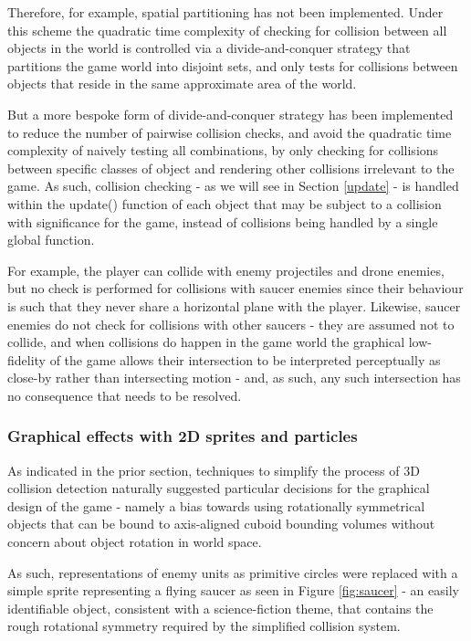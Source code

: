 \documentclass[11pt]{article}
\begin{document}
Therefore, for example, spatial partitioning has not been implemented. Under this scheme the quadratic time
complexity of checking for collision between all objects in the world is controlled via a divide-and-conquer
strategy that partitions the game world into disjoint sets, and only tests for collisions between objects that
reside in the same approximate area of the world.

But a more bespoke form of divide-and-conquer strategy has been implemented to reduce the number of pairwise collision
checks, and avoid the quadratic time complexity of naively testing all combinations, by only checking for collisions
between specific classes of object and rendering other collisions irrelevant to the game. As such, collision checking - 
as we will see in Section \ref{update} - is handled within the update() function of each object that may be subject to
a collision with significance for the game, instead of collisions being handled by a single global function.

For example, the player can collide with enemy projectiles and drone enemies, but no check is performed
for collisions with saucer enemies since their behaviour is such that they never share a horizontal
plane with the player. Likewise, saucer enemies do not check for collisions with other saucers - they are 
assumed not to collide, and when collisions do happen in the game world the graphical low-fidelity of the
game allows their intersection to be interpreted perceptually as close-by rather than intersecting motion -
and, as such, any such intersection has no consequence that needs to be resolved.

\subsubsection*{Graphical effects with 2D sprites and particles}

As indicated in the prior section, techniques to simplify the process of 3D collision detection naturally
suggested particular decisions for the graphical design of the game - namely a bias towards using rotationally
symmetrical objects that can be bound to axis-aligned cuboid bounding volumes without concern about object
rotation in world space.

As such, representations of enemy units as primitive circles were replaced with a simple sprite representing
a flying saucer as seen in Figure \ref{fig:saucer} - an easily identifiable object, consistent with a science-fiction theme,
that contains the rough rotational symmetry required by the simplified collision system.
\end{document}
